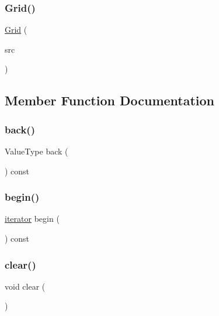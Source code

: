 \subsubsection{\texorpdfstring{Grid()}{Grid()}\hspace{0.1cm}{\footnotesize\ttfamily [5/5]}}
{\footnotesize\ttfamily \mbox{\hyperlink{classGrid}{Grid}} (\begin{DoxyParamCaption}\item[{const \mbox{\hyperlink{classGrid}{Grid}}$<$ Value\+Type $>$ \&}]{src }\end{DoxyParamCaption})\hspace{0.3cm}{\ttfamily [inline]}}



\subsection{Member Function Documentation}
\mbox{\label{classGrid_a38cbd80c93f450dc9bf3ca7c6a6220bd}} 
\subsubsection{\texorpdfstring{back()}{back()}}
{\footnotesize\ttfamily Value\+Type back (\begin{DoxyParamCaption}{ }\end{DoxyParamCaption}) const}

\mbox{\label{classGrid_a0c62c15c8ed609e7e5e9518cf5f5c712}} 
\subsubsection{\texorpdfstring{begin()}{begin()}}
{\footnotesize\ttfamily \mbox{\hyperlink{classGrid_1_1iterator}{iterator}} begin (\begin{DoxyParamCaption}{ }\end{DoxyParamCaption}) const\hspace{0.3cm}{\ttfamily [inline]}}

\mbox{\label{classGrid_ac8bb3912a3ce86b15842e79d0b421204}} 
\subsubsection{\texorpdfstring{clear()}{clear()}}
{\footnotesize\ttfamily void clear (\begin{DoxyParamCaption}{ }\end{DoxyParamCaption})}

